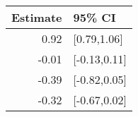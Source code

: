 \begin{tabular}{rl}
  \hline
Estimate & 95\% CI \\ 
  \hline
0.92 & [0.79,1.06] \\ 
  -0.01 & [-0.13,0.11] \\ 
  -0.39 & [-0.82,0.05] \\ 
  -0.32 & [-0.67,0.02] \\ 
   \hline
\end{tabular}

